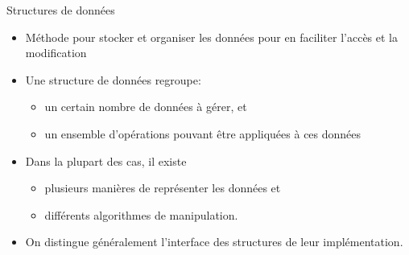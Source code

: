 





\begin{frame}{Structures de données}

\begin{itemize}
\item Méthode pour stocker et organiser les données pour en faciliter
  l'accès et la modification
\item Une structure de données regroupe:
\begin{itemize}
\item un certain nombre de données à gérer, et
\item un ensemble d'opérations pouvant être appliquées à ces données
\end{itemize}
\item Dans la plupart des cas, il existe
\begin{itemize}
\item plusieurs manières de représenter les données et
\item différents algorithmes de manipulation.
\end{itemize}
\item On distingue généralement l'\alert{interface} des structures de
  leur \alert{implémentation}.
\end{itemize}

\end{frame}

